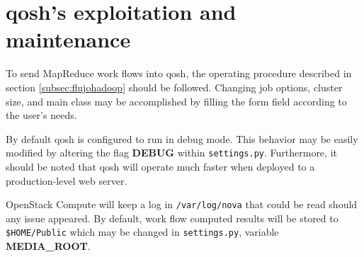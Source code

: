\section{qosh's exploitation and maintenance}\label{sec:explotacionqosh}
\noindent To send MapReduce work flows into qosh, the operating procedure described in section \ref{subsec:flujohadoop} should be followed. Changing job options, cluster size, and main class may be accomplished by filling the form field according to the user's needs.

By default qosh is configured to run in debug mode. This behavior may be easily modified by altering the flag \textbf{DEBUG} within \texttt{settings.py}. Furthermore, it should be noted that qosh will operate much faster when deployed to a production-level web server.

OpenStack Compute will keep a log in \texttt{/var/log/nova} that could be read should any issue appeared. By default, work flow computed results will be stored to \texttt{\$HOME/Public} which may be changed in \texttt{settings.py}, variable \textbf{MEDIA\_ROOT}.
